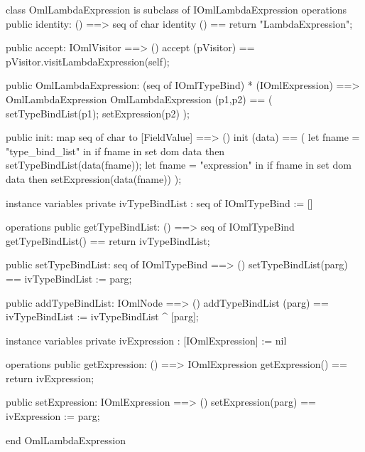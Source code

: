 \begin{vdm_al}
class OmlLambdaExpression is subclass of IOmlLambdaExpression
operations
  public identity: () ==> seq of char
  identity () == return "LambdaExpression";

  public accept: IOmlVisitor ==> ()
  accept (pVisitor) == pVisitor.visitLambdaExpression(self);

  public OmlLambdaExpression:
      (seq of IOmlTypeBind) *
      (IOmlExpression) ==> OmlLambdaExpression
  OmlLambdaExpression (p1,p2) == 
   ( setTypeBindList(p1);
     setExpression(p2) );

  public init: map seq of char to [FieldValue] ==> ()
  init (data) ==
    ( let fname = "type_bind_list" in
        if fname in set dom data
        then setTypeBindList(data(fname));
      let fname = "expression" in
        if fname in set dom data
        then setExpression(data(fname)) );

instance variables
  private ivTypeBindList : seq of IOmlTypeBind := []

operations
  public getTypeBindList: () ==> seq of IOmlTypeBind
  getTypeBindList() == return ivTypeBindList;

  public setTypeBindList: seq of IOmlTypeBind ==> ()
  setTypeBindList(parg) == ivTypeBindList := parg;

  public addTypeBindList: IOmlNode ==> ()
  addTypeBindList (parg) == ivTypeBindList := ivTypeBindList ^ [parg];

instance variables
  private ivExpression : [IOmlExpression] := nil

operations
  public getExpression: () ==> IOmlExpression
  getExpression() == return ivExpression;

  public setExpression: IOmlExpression ==> ()
  setExpression(parg) == ivExpression := parg;

end OmlLambdaExpression
\end{vdm_al}

